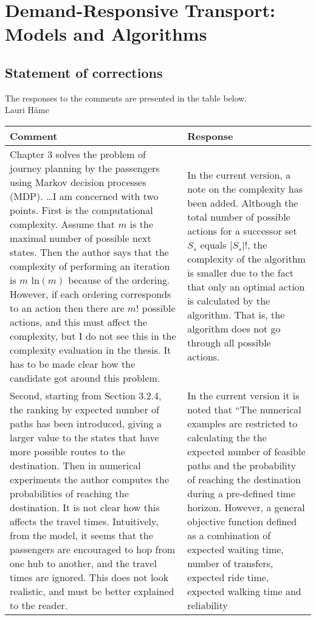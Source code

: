\documentclass[a4paper,12pt]{article}
\begin{document}
\section*{Demand-Responsive Transport: Models and Algorithms}
\subsection*{Statement of corrections}
The responses to the comments are presented in the table below. \\
Lauri H\"ame

\begin{longtable}{|p{}|p{}|}
\hline
Comment & Response \\ \hline
Chapter 3 solves the problem of journey planning by the passengers using Markov decision
processes (MDP). \ldots I am concerned with two points. First
is the computational complexity. Assume that $m$ is the maximal number of possible next states.
Then the author says that the complexity of performing an iteration is $m$ ln$(m)$ because of the
ordering. However, if each ordering corresponds to an action then there are $m!$ possible actions,
and this must affect the complexity, but I do not see this in the complexity evaluation in the
thesis. It has to be made clear how the candidate got around this problem. 
& 
In the current version, a note on the complexity has been added. Although the total number of 
possible actions for a successor set $S_s$ equals $|S_s|!$, the complexity of the algorithm is smaller due to the fact that 
only an optimal action is calculated by the algorithm. That is, the algorithm does not go through all possible
actions. 
\\ \hline
Second, starting from
Section 3.2.4, the ranking by expected number of paths has been introduced, giving a larger value
to the states that have more possible routes to the destination. Then in numerical experiments
the author computes the probabilities of reaching the destination. It is not clear how this affects
the travel times. Intuitively, from the model, it seems that the passengers are encouraged to hop
from one hub to another, and the travel times are ignored. This does not look realistic, and must
be better explained to the reader. 
& 
In the current version it is noted that ``The numerical examples are restricted to calculating the the expected number of feasible paths and 
the probability of reaching the destination during a pre-defined time horizon. However, a general objective function
defined as a combination of expected waiting time, number of transfers, expected ride time, expected walking time and reliability

\end{longtable}
\end{document}
